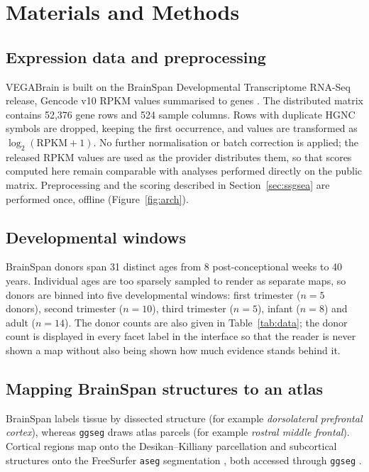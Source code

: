 \documentclass[pdflatex,sn-basic]{sn-jnl}
\begin{document}
\section{Materials and Methods}\label{sec:methods}

\subsection{Expression data and preprocessing}\label{sec:data}

VEGABrain is built on the BrainSpan Developmental Transcriptome RNA-Seq release,
Gencode v10 RPKM values summarised to genes \citep{BrainSpan2011,Miller2014}.
The distributed matrix contains 52{,}376 gene rows and 524 sample columns. Rows
with duplicate HGNC symbols are dropped, keeping the first occurrence, and
values are transformed as $\log_2(\mathrm{RPKM} + 1)$. No further normalisation
or batch correction is applied; the released RPKM values are used as the
provider distributes them, so that scores computed here remain comparable with
analyses performed directly on the public matrix. Preprocessing and the scoring
described in Section~\ref{sec:ssgsea} are performed once, offline
(Figure~\ref{fig:arch}).

\subsection{Developmental windows}\label{sec:ages}

BrainSpan donors span 31 distinct ages from 8 post-conceptional weeks to 40
years. Individual ages are too sparsely sampled to render as separate maps, so
donors are binned into five developmental windows: first trimester ($n=5$
donors), second trimester ($n=10$), third trimester ($n=5$), infant ($n=8$) and
adult ($n=14$). The donor counts are also given in Table~\ref{tab:data}; the
donor count is displayed in every facet label in the
interface so that the reader is never shown a map without also being shown how
much evidence stands behind it.

\subsection{Mapping BrainSpan structures to an atlas}\label{sec:mapping}

BrainSpan labels tissue by dissected structure (for example \emph{dorsolateral
prefrontal cortex}), whereas \texttt{ggseg} draws atlas parcels (for example
\emph{rostral middle frontal}). Cortical regions map onto the Desikan--Killiany parcellation
\citep{Desikan2006} and subcortical structures onto the FreeSurfer
\texttt{aseg} segmentation \citep{Fischl2002}, both accessed through
\texttt{ggseg} \citep{Mowinckel2020}.
\end{document}
